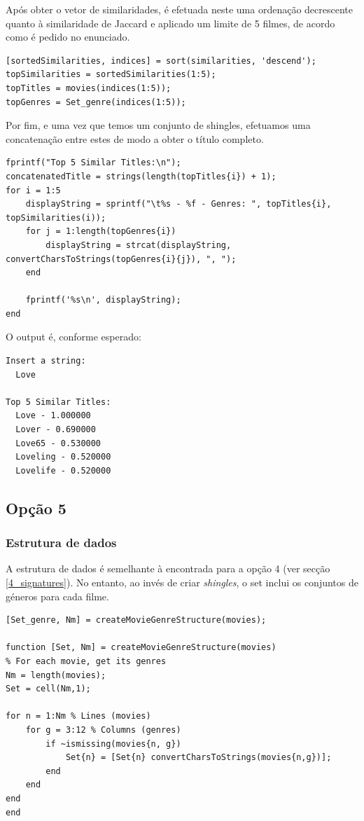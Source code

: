 \documentclass[portuguese, 11pt, a4paper,titlepage, oneside]{article}
\begin{document}
Após obter o vetor de similaridades, é efetuada neste uma ordenação decrescente quanto à similaridade de Jaccard e aplicado um limite de 5 filmes, de acordo como é pedido no enunciado.
\begin{lstlisting}[style=Matlab-editor]
[sortedSimilarities, indices] = sort(similarities, 'descend');
topSimilarities = sortedSimilarities(1:5);
topTitles = movies(indices(1:5));
topGenres = Set_genre(indices(1:5));
\end{lstlisting}

Por fim, e uma vez que temos um conjunto de shingles, efetuamos uma concatenação entre estes de modo a obter o título completo.

\begin{lstlisting}[style=Matlab-editor]
fprintf("Top 5 Similar Titles:\n");
concatenatedTitle = strings(length(topTitles{i}) + 1);
for i = 1:5
    displayString = sprintf("\t%s - %f - Genres: ", topTitles{i}, topSimilarities(i));
    for j = 1:length(topGenres{i})
        displayString = strcat(displayString, convertCharsToStrings(topGenres{i}{j}), ", ");
    end

    fprintf('%s\n', displayString);
end
\end{lstlisting}

O output é, conforme esperado:
\begin{lstlisting}[style=Matlab-editor]
Insert a string: 
  Love

Top 5 Similar Titles:
  Love - 1.000000
  Lover - 0.690000
  Love65 - 0.530000
  Loveling - 0.520000
  Lovelife - 0.520000
\end{lstlisting}

\subsection{Opção 5}
\subsubsection{Estrutura de dados}
A estrutura de dados é semelhante à encontrada para a opção 4 (ver secção \ref{4_signatures}). No entanto, ao invés de criar \textit{shingles}, o set inclui os conjuntos de géneros para cada filme.

\begin{lstlisting}[style=Matlab-editor]
[Set_genre, Nm] = createMovieGenreStructure(movies);

function [Set, Nm] = createMovieGenreStructure(movies)
% For each movie, get its genres
Nm = length(movies);
Set = cell(Nm,1);

for n = 1:Nm % Lines (movies)
    for g = 3:12 % Columns (genres)
        if ~ismissing(movies{n, g})
            Set{n} = [Set{n} convertCharsToStrings(movies{n,g})];
        end
    end
end
end
\end{lstlisting}
\end{document}
